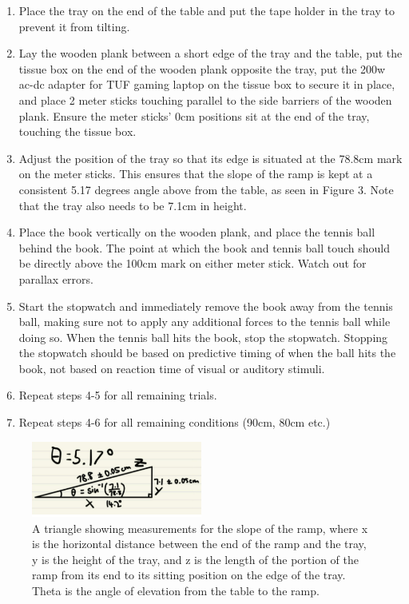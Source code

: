 \documentclass[12pt]{report}
\begin{document}
\begin{enumerate}
    \item Place the tray on the end of the table and put the tape holder in the tray to prevent it from tilting.
    \item Lay the wooden plank between a short edge of the tray and the table, put the tissue box on the end of the wooden plank opposite the tray, put the 200w ac-dc adapter for TUF gaming laptop on the tissue box to secure it in place, and place 2 meter sticks touching parallel to the side barriers of the wooden plank. Ensure the meter sticks’ 0cm positions sit at the end of the tray, touching the tissue box.
    \item Adjust the position of the tray so that its edge is situated at the 78.8cm mark on the meter sticks. This ensures that the slope of the ramp is kept at a consistent 5.17 degrees angle above from the table, as seen in Figure 3. Note that the tray also needs to be 7.1cm in height.
    \item Place the book vertically on the wooden plank, and place the tennis ball behind the book. The point at which the book and tennis ball touch should be directly above the 100cm mark on either meter stick. Watch out for parallax errors.
    \item Start the stopwatch and immediately remove the book away from the tennis ball, making sure not to apply any additional forces to the tennis ball while doing so. When the tennis ball hits the book, stop the stopwatch. Stopping the stopwatch should be based on predictive timing of when the ball hits the book, not based on reaction time of visual or auditory stimuli.
    \item Repeat steps 4-5 for all remaining trials.
    \item Repeat steps 4-6 for all remaining conditions (90cm, 80cm etc.)
\end{enumerate}
\begin{figure}
    \centering
    \includegraphics[width=0.5\textwidth]{working.png}
    \caption{A triangle showing measurements for the slope of the ramp, where x is the horizontal distance between the end of the ramp and the tray, y is the height of the tray, and z is the length of the portion of the ramp from its end to its sitting position on the edge of the tray. Theta is the angle of elevation from the table to the ramp.}
\end{figure} \newline
\end{document}
